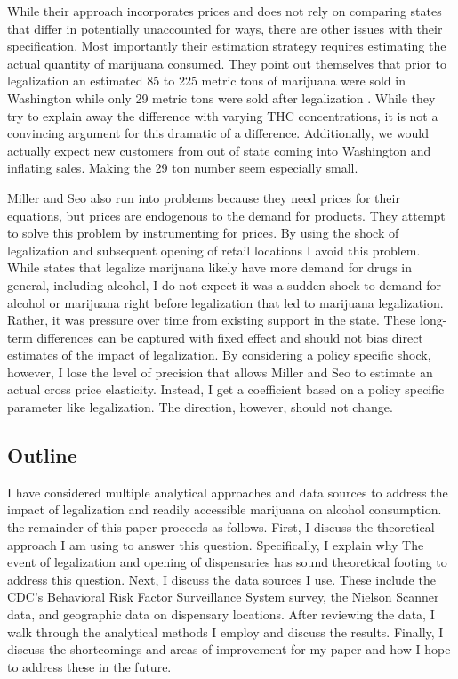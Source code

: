 \documentclass[11pt]{article}
\begin{document}
While their approach incorporates prices and does not rely on comparing states that differ in potentially unaccounted for ways, there are other issues with their specification. Most importantly their estimation strategy requires estimating the actual quantity of marijuana consumed. They point out themselves that prior to legalization an estimated 85 to 225 metric tons of marijuana were sold in Washington while only 29 metric tons were sold after legalization \cite[p.~13]{ miller_seo_2018}.  While they try to explain away the difference with varying THC concentrations, it is not a convincing argument for this dramatic of a difference. Additionally, we would actually expect new customers from out of state coming into Washington and inflating sales. Making the 29 ton number seem especially small. \par


Miller and Seo also run into problems because they need prices for their equations, but prices are endogenous to the demand for products. They attempt to solve this problem by instrumenting for prices. By using the shock of legalization and subsequent opening of retail locations I avoid this problem. While states that legalize marijuana likely have more demand for drugs in general, including alcohol, I do not expect it was a sudden shock to demand for alcohol or marijuana right before legalization that led to marijuana legalization. Rather, it was pressure over time from existing support in the state. These long-term differences can be captured with fixed effect and should not bias direct estimates of the impact of legalization. By considering a policy specific shock, however, I lose the level of precision that allows Miller and Seo to estimate an actual cross price elasticity. Instead, I get a coefficient based on a policy specific parameter like legalization. The direction, however, should not change. 





\subsection{Outline}



I have considered multiple analytical approaches and data sources to address the impact of legalization and readily accessible marijuana on alcohol consumption. the remainder of this paper proceeds as follows. First, I discuss the theoretical approach I am using to answer this question. Specifically, I explain why The event of legalization and opening of dispensaries has sound theoretical footing to address this question. Next, I discuss the data sources I use. These include the CDC's Behavioral Risk Factor Surveillance System survey, the Nielson Scanner data, and geographic data on dispensary locations. After reviewing the data, I  walk through the analytical methods I employ and discuss the results. Finally, I discuss the shortcomings and areas of improvement for my paper and how I hope to address these in the future. 
\end{document}
